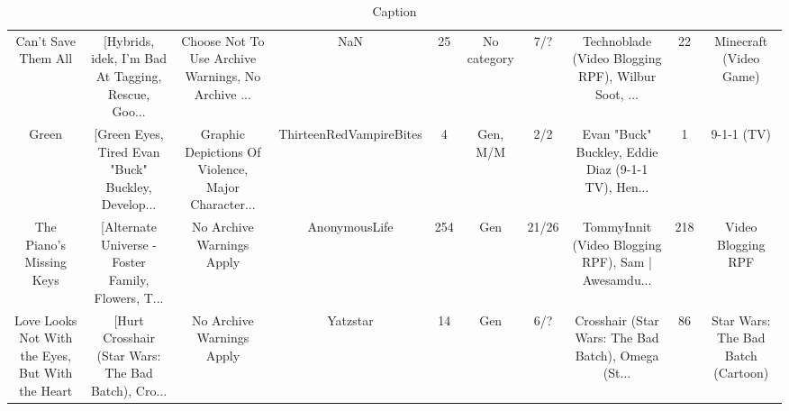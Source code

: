 \begin{table}[h!]
{\begin{tabular}{|c|c|c|c|c|c|c|c|c|c|}
                               Can't Save Them All & [Hybrids, idek, I'm Bad At Tagging, Rescue, Goo... & Choose Not To Use Archive Warnings, No Archive ... &                                NaN &        25 &                      No category &      7/? & Technoblade (Video Blogging RPF), Wilbur Soot, ... &       22 &                             Minecraft (Video Game) \\
                                             Green & [Green Eyes, Tired Evan "Buck" Buckley, Develop... & Graphic Depictions Of Violence, Major Character... &            ThirteenRedVampireBites &         4 &                         Gen, M/M &      2/2 & Evan "Buck" Buckley, Eddie Diaz (9-1-1 TV), Hen... &        1 &                                         9-1-1 (TV) \\
                          The Piano's Missing Keys & [Alternate Universe - Foster Family, Flowers, T... &                          No Archive Warnings Apply &                      AnonymousLife &       254 &                              Gen &    21/26 & TommyInnit (Video Blogging RPF), Sam | Awesamdu... &      218 &                                 Video Blogging RPF \\
  Love Looks Not With the Eyes, But With the Heart & [Hurt Crosshair (Star Wars: The Bad Batch), Cro... &                          No Archive Warnings Apply &                           Yatzstar &        14 &                              Gen &      6/? & Crosshair (Star Wars: The Bad Batch), Omega (St... &       86 &                 Star Wars: The Bad Batch (Cartoon) \\
\hline
\end{tabular}}
 \caption{Caption}
 \label{tab:my_label}
\end{table}
